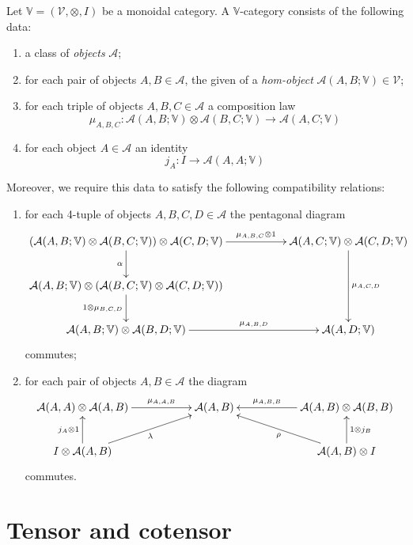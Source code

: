 \begin{defin}
Let $\mathbb V = (\mathcal V, \otimes, I)$ be a monoidal category. A $\mathbb V$-category consists of the following data:
\begin{enumerate}
\item a class of \emph{objects} $\mathcal A$;
\item for each pair of objects $A,B \in \mathcal A$, the given of a \emph{hom-object} $\mathcal A(A,B;\mathbb V) \in \mathcal V$;
\item for each triple of objects $A,B,C \in \mathcal A$ a composition law
\[
\mu_{A,B,C} \colon \mathcal A(A,B; \mathbb V) \otimes \mathcal A(B,C; \mathbb V) \to \mathcal A(A,C;\mathbb V)
\]
\item for each object $A \in \mathcal A$ an identity
\[
j_A \colon I \to \mathcal A(A,A;\mathbb V)
\]
\end{enumerate}
Moreover, we require this data to satisfy the following compatibility relations: 
\begin{enumerate}
\item for each 4-tuple of objects $A,B,C,D \in \mathcal A$ the pentagonal diagram
\[
\xymatrix{
(\mathcal A(A,B; \mathbb V) \otimes \mathcal A(B,C; \mathbb V)) \otimes \mathcal A(C,D;\mathbb V) \ar[d]_\alpha \ar[rr]^-{\mu_{A,B,C} \otimes 1} & & \mathcal A(A,C;\mathbb V) \otimes \mathcal A(C,D;\mathbb V) \ar[dd]^{\mu_{A,C,D}} \\
\mathcal A(A,B; \mathbb V) \otimes (\mathcal A(B,C; \mathbb V) \otimes \mathcal A(C,D;\mathbb V)) \ar[d]_{1 \otimes \mu_{B,C,D}} \\ \mathcal A(A,B;\mathbb V) \otimes \mathcal A(B,D;\mathbb V) \ar[rr]^-{\mu_{A,B,D}} & & \mathcal A(A,D;\mathbb V)
}
\]
commutes;
\item for each pair of objects $A,B \in \mathcal A$ the diagram
\[
\xymatrix{
\mathcal A(A,A) \otimes \mathcal A(A,B) \ar[rr]^-{\mu_{A,A,B}} & & \mathcal A(A,B) & & \mathcal A(A,B) \otimes \mathcal A(B,B) \ar[ll]_-{\mu_{A,B,B}} \\ I \otimes \mathcal A(A,B) \ar[u]^{j_A \otimes 1} \ar[urr]_{\lambda} & & & & \mathcal A(A,B) \otimes I \ar[u]_{1 \otimes j_B} \ar[ull]^{\rho}
}
\]
commutes.
\end{enumerate}
\end{defin}


\section{Tensor and cotensor}


